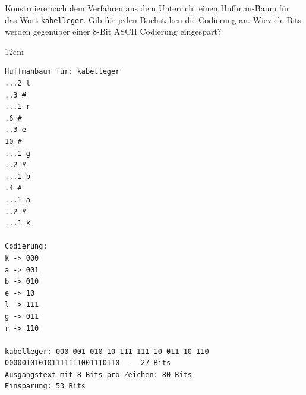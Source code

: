 \question[4]
Konstruiere nach dem Verfahren aus dem Unterricht einen Huffman-Baum
für das Wort \texttt{kabelleger}. Gib für jeden Buchstaben die Codierung an.
Wieviele Bits werden gegenüber einer 8-Bit ASCII Codierung eingespart?

\begin{solutionbox}{12cm}
\begin{lstlisting}
Huffmanbaum für: kabelleger
...2 l
..3 #
...1 r
.6 #
..3 e
10 #
...1 g
..2 #
...1 b
.4 #
...1 a
..2 #
...1 k

Codierung:
k -> 000
a -> 001
b -> 010
e -> 10
l -> 111
g -> 011
r -> 110

kabelleger: 000 001 010 10 111 111 10 011 10 110
000001010101111111001110110  -  27 Bits
Ausgangstext mit 8 Bits pro Zeichen: 80 Bits
Einsparung: 53 Bits
\end{lstlisting}
\end{solutionbox}
